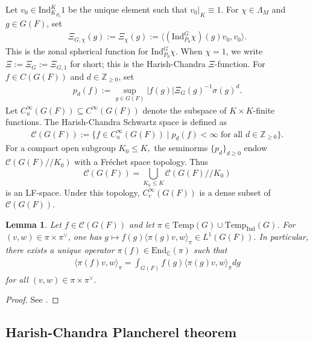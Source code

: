 \documentclass[10pt]{amsart}
\newtheorem{lemma}[theorem]{Lemma}
\theoremstyle{definition}
\numberwithin{equation}{section}
\numberwithin{equation}{subsection}
\newcommand{\Ind}{\mathrm{Ind}}
\newcommand{\Temp}{\mathrm{Temp}}
\begin{document}
Let $v_0\in \Ind_{K_{P_0}}^K1$ be the unique element such that $v_0\vert_{K}\equiv 1$. For $\chi\in \Lambda_M$ and $g\in G(F)$, set
\begin{align}\label{defn:zonal:spherical}
    \Xi_{G,\chi}(g) :=\Xi_{\chi}(g):= \langle(\Ind_{P_0}^G \chi)(g)v_0,v_0\rangle.
\end{align}
This is the zonal spherical function for $\Ind_{P_0}^G \chi$. When $\chi=1$, we write $\Xi:=\Xi_G := \Xi_{G,1}$ for short; this is the Harish-Chandra $\Xi$-function. For $f\in C(G(F))$ and $d\in\mathbb{Z}_{\geq 0}$, set
\begin{align*}
    p_d(f) := \sup_{g\in G(F)} |f(g)|\Xi_G(g)^{-1}\sigma(g)^d.
\end{align*}
Let $C_u^\infty(G(F))\subseteq C^\infty(G(F))$ denote the subspace of $K\times K$-finite functions. The Harish-Chandra Schwartz space is defined as
\begin{align*}
    \mathcal{C}(G(F)):= \{f\in C_u^\infty(G(F))\mid p_d(f)<\infty \text{ for all }d\in\mathbb{Z}_{\geq 0}\}.
\end{align*}
For a compact open subgroup $K_0\le K,$ the seminorms $\{p_d\}_{d\ge 0}$ endow $\mathcal{C}(G(F)/\!/K_0)$ with a Fr\'echet space topology. Thus
$$\mathcal{C}(G(F))=\bigcup_{K_0\le K}\mathcal{C}(G(F)/\!/K_0)$$
is an LF-space. Under this topology, $C^\infty_c(G(F))$ is a dense subset of $\mathcal{C}(G(F)).$

\begin{lemma}\label{lem:CGconverge} Let $f\in \mathcal{C}(G(F))$ and let $\pi\in \Temp(G)\cup\Temp_\Ind(G)$. For $(v,w)\in \pi\times\pi^\vee$, one has $g\mapsto f(g)\langle \pi(g)v,w\rangle_\pi\in L^1(G(F))$. In particular, there exists a unique operator $\pi(f)\in\mathrm{End}_\mathbb{C}(\pi)$ such that
\begin{align*}
    \langle \pi(f)v,w\rangle_\pi = \int_{G(F)} f(g)\langle \pi(g)v,w\rangle_\pi dg
\end{align*}
for all $(v,w)\in \pi\times \pi^\vee$.
\end{lemma}
\begin{proof} See \cite[III.7, p.~273]{Waldspurger:Plancherel}.    
\end{proof}


\subsection{Harish-Chandra Plancherel theorem}\label{ssec:HCplancherel}
\end{document}
